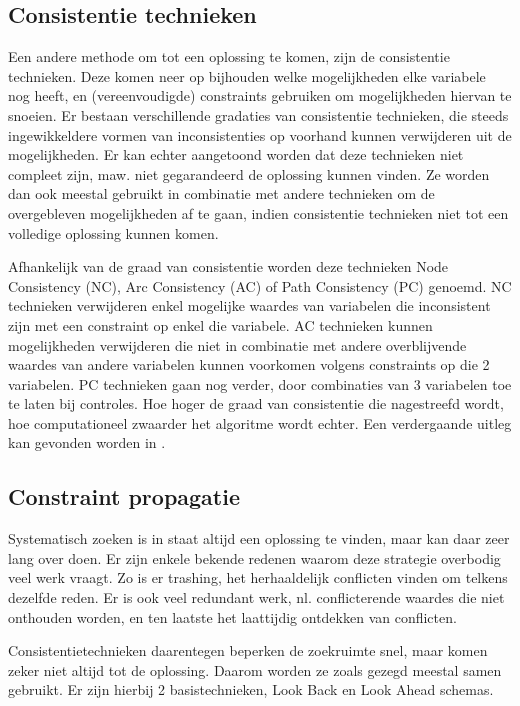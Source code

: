 \subsection{Consistentie technieken}

Een andere methode om tot een oplossing te komen, zijn de consistentie technieken. Deze komen neer op bijhouden welke mogelijkheden elke variabele nog heeft, en (vereenvoudigde) constraints gebruiken om mogelijkheden hiervan te snoeien. Er bestaan verschillende gradaties van consistentie technieken, die steeds ingewikkeldere vormen van inconsistenties op voorhand kunnen verwijderen uit de mogelijkheden. Er kan echter aangetoond worden dat deze technieken niet compleet zijn, maw. niet gegarandeerd de oplossing kunnen vinden. Ze worden dan ook meestal gebruikt in combinatie met andere technieken om de overgebleven mogelijkheden af te gaan, indien consistentie technieken niet tot een volledige oplossing kunnen komen.

Afhankelijk van de graad van consistentie worden deze technieken Node Consistency (NC), Arc Consistency (AC) of Path Consistency (PC) genoemd. NC technieken verwijderen enkel mogelijke waardes van variabelen die inconsistent zijn met een constraint op enkel die variabele. AC technieken kunnen mogelijkheden verwijderen die niet in combinatie met andere overblijvende waardes van andere variabelen kunnen voorkomen volgens constraints op die 2 variabelen. PC technieken gaan nog verder, door combinaties van 3 variabelen toe te laten bij controles. Hoe hoger de graad van consistentie die nagestreefd wordt, hoe computationeel zwaarder het algoritme wordt echter. Een verdergaande uitleg kan gevonden worden in \cite{bartak01}.

\subsection{Constraint propagatie}

Systematisch zoeken is in staat altijd een oplossing te vinden, maar kan daar zeer lang over doen. Er zijn enkele bekende redenen waarom deze strategie overbodig veel werk vraagt. Zo is er trashing, het herhaaldelijk conflicten vinden om telkens dezelfde reden. Er is ook veel redundant werk, nl. conflicterende waardes die niet onthouden worden, en ten laatste het laattijdig ontdekken van conflicten.

Consistentietechnieken daarentegen beperken de zoekruimte snel, maar komen zeker niet altijd tot de oplossing. Daarom worden ze zoals gezegd meestal samen gebruikt. Er zijn hierbij 2 basistechnieken, Look Back en Look Ahead schemas.

